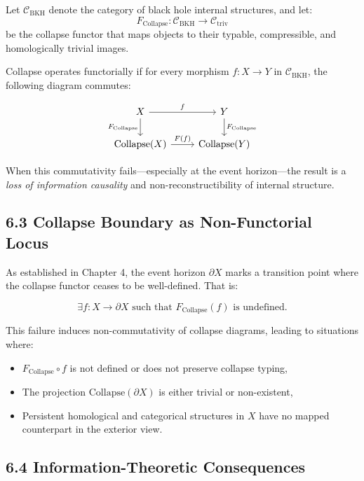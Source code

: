 \documentclass[11pt]{article}
\begin{document}
Let \( \mathcal{C}_{\mathrm{BKH}} \) denote the category of black hole internal structures, and let:
\[
F_{\mathrm{Collapse}} : \mathcal{C}_{\mathrm{BKH}} \longrightarrow \mathcal{C}_{\mathrm{triv}}
\]
be the collapse functor that maps objects to their typable, compressible, and homologically trivial images.

Collapse operates functorially if for every morphism \( f : X \to Y \) in \( \mathcal{C}_{\mathrm{BKH}} \), the following diagram commutes:

\[
\begin{tikzcd}
X \arrow[r, "f"] \arrow[d, "F_{\mathrm{Collapse}}"']
& Y \arrow[d, "F_{\mathrm{Collapse}}"] \\
\mathrm{Collapse}(X) \arrow[r, "F(f)"]
& \mathrm{Collapse}(Y)
\end{tikzcd}
\]

When this commutativity fails—especially at the event horizon—the result is a \emph{loss of information causality} and non-reconstructibility of internal structure.

\subsection*{6.3 Collapse Boundary as Non-Functorial Locus}

As established in Chapter 4, the event horizon \( \partial X \) marks a transition point where the collapse functor ceases to be well-defined. That is:

\[
\exists f : X \to \partial X \text{ such that } F_{\mathrm{Collapse}}(f) \text{ is undefined}.
\]

This failure induces non-commutativity of collapse diagrams, leading to situations where:

\begin{itemize}
    \item \( F_{\mathrm{Collapse}} \circ f \) is not defined or does not preserve collapse typing,
    \item The projection \( \mathrm{Collapse}(\partial X) \) is either trivial or non-existent,
    \item Persistent homological and categorical structures in \( X \) have no mapped counterpart in the exterior view.
\end{itemize}

\subsection*{6.4 Information-Theoretic Consequences}
\end{document}
